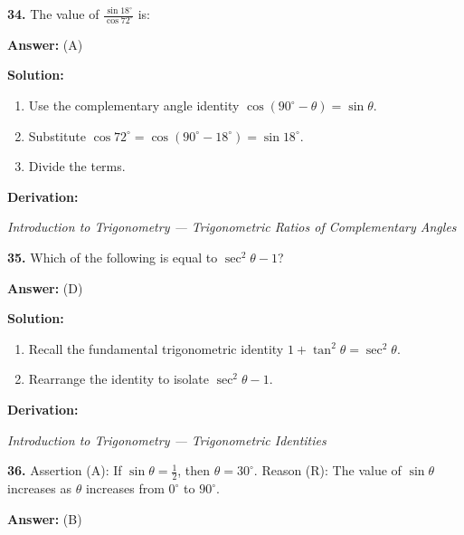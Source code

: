 \documentclass[12pt,a4paper]{exam}
\newcommand{\fitmath}[1]{%
  \sbox{\schmathbox}{$\displaystyle #1$}%
  \ifdim\wd\schmathbox>\linewidth
    \resizebox{\linewidth}{!}{\usebox{\schmathbox}}%
  \else
    \usebox{\schmathbox}%
  \fi}
\begin{document}
\begin{questions}
\question \textbf{34.} The value of $\frac{\sin 18^\circ}{\cos 72^\circ}$ is:

\textbf{Answer:}
(A)

\textbf{Solution:}
\begin{enumerate}
  \item Use the complementary angle identity $\cos(90^\circ - \theta) = \sin \theta$.
  \item Substitute $\cos 72^\circ = \cos(90^\circ - 18^\circ) = \sin 18^\circ$.
  \item Divide the terms.
\end{enumerate}
\textbf{Derivation:}
\begin{center}
\fitmath{\frac{\sin 18^\circ}{\cos 72^\circ} = \frac{\sin 18^\circ}{\sin 18^\circ} = 1}
\end{center}
\hfill \textit{Introduction to Trigonometry — Trigonometric Ratios of Complementary Angles}
\vspace{0.3cm}

\question \textbf{35.} Which of the following is equal to $\sec^2 \theta - 1$?

\textbf{Answer:}
(D)

\textbf{Solution:}
\begin{enumerate}
  \item Recall the fundamental trigonometric identity $1 + \tan^2 \theta = \sec^2 \theta$.
  \item Rearrange the identity to isolate $\sec^2 \theta - 1$.
\end{enumerate}
\textbf{Derivation:}
\begin{center}
\fitmath{\begin{aligned}
1 + \tan^2 \theta = \sec^2 \theta \\
\implies \sec^2 \theta - 1 = \tan^2 \theta
\end{aligned}}
\end{center}
\hfill \textit{Introduction to Trigonometry — Trigonometric Identities}
\vspace{0.3cm}

\question \textbf{36.} Assertion (A): If $\sin \theta = \frac{1}{2}$, then $\theta = 30^\circ$. Reason (R): The value of $\sin \theta$ increases as $\theta$ increases from $0^\circ$ to $90^\circ$.

\textbf{Answer:}
(B)


\end{questions}
\end{document}
